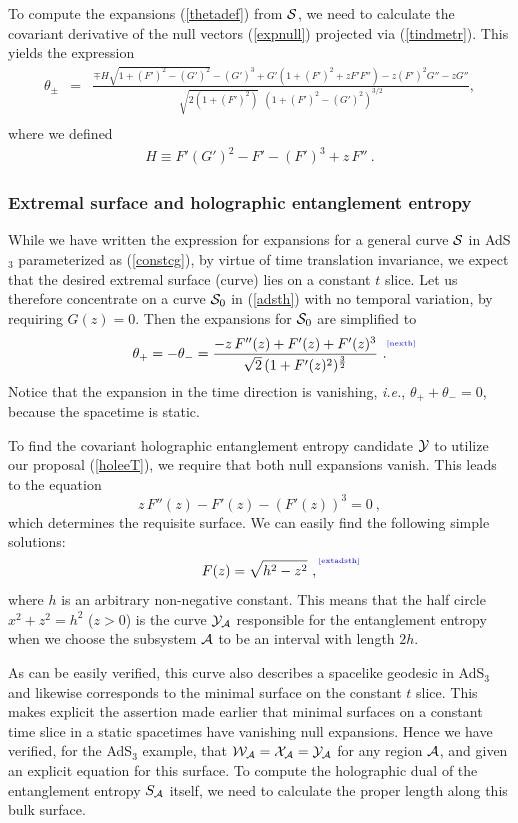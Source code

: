 \documentclass[12pt]{article}
\newcommand{\be}{\begin{equation}}
\newcommand{\ee}{\end{equation}}
\def\req#1{(\ref{#1})}
\def\ie{{\it i.e.}}
\def\s{\sigma}
\def\CA{{\cal A}}
\def\CS{{\cal S}}
\def\CW{{\cal W}}
\def\CX{{\cal X}}
\def\CY{{\cal Y}}
\def\f#1#2{{\frac{#1}{#2}}}
\def\f#1#2{{\frac{#1}{#2}}}
\def\Label#1{\label{#1}%
{ \color{blue}{\smash{\hbox to0pt{\raise2ex\hbox{\tiny[#1]}\hss}}}}}
\def\ms{\CS}
\def\Gms{\CW}
\def\Lms{\CY}
\def\Xms{\CX}
\def\rA{\CA}
\def\ads#1{AdS$_{#1}$}
\def\s{\sqrt}
\def\f {\frac}
\def\no{\nonumber \\}
\begin{document}
To compute the expansions \req{thetadef} from $\ms$, we need to calculate the
covariant derivative of the null vectors \req{expnull} projected via \req{tindmetr}.
This yields the expression
%
\begin{eqnarray}
\theta_{\pm} &=& \f{\mp H\s{1+(F')^2-(G')^2}
-(G')^3+G'(1+(F')^2+zF'F'')-z(F')^2G''-zG''}{\s{2(1+(F')^2)}\, \;
(1+(F')^2-(G')^2)^{3/2}}, \no
\end{eqnarray}
%
where we defined
\begin{eqnarray}
H \equiv F'(G')^2-F'-(F')^3+z \, F''\ .
\end{eqnarray}

\subsubsection{Extremal surface and holographic entanglement entropy}

While we have written the expression for expansions for a general
curve $\ms$ in \ads{3} parameterized as \req{constcg}, by virtue of
time translation invariance, we expect that the desired extremal
surface (curve)  lies  on a constant $t$ slice. Let us therefore
concentrate on a curve $\ms_0$ in \req{adsth} with no temporal
variation, by requiring $G(z)=0$. Then the expansions for $\ms_0$
are simplified to
%
\be \theta_+=-\theta_-=\f{-z\, F''(z)+F'(z)+F'(z)^3} {\s{2}\,
(1+F'(z)^2)^{\f{3}{2}}} \ . \Label{nexth}
 \ee
Notice that the expansion in the time direction is vanishing, \ie,
$\theta_+ +\theta_-=0$, because the spacetime is static.

To find the covariant holographic entanglement entropy candidate
$\Lms$ to utilize our proposal \req{holeeT}, we require that both
null expansions vanish. This leads to the equation
%
\be z \, F''(z)-F'(z)-(F'(z))^3=0 \ , \ee
%
which determines the requisite surface.
We can easily find the following simple solutions:
%
\be F(z)=\s{h^2-z^2} \ ,
\Label{extadsth} \ee
%
where $h$ is an arbitrary non-negative constant. This means that the
half circle $x^2+z^2=h^2$ ($z>0$) is the curve $\Lms_{\rA}$
responsible for the entanglement entropy when we choose the
subsystem $\rA$ to be an interval with length $2h$.

As can be easily verified, this curve also describes
a spacelike geodesic in AdS$_3$ and likewise corresponds to the minimal surface on
the constant $t$ slice. This makes explicit the assertion made
earlier that minimal surfaces on a constant time slice in a static
spacetimes have vanishing null expansions.
Hence we have verified, for the AdS$_3$ example, that $\Gms_{\rA} = \Xms_{\rA} = \Lms_{\rA}$ for any region $\rA$, and given an explicit equation for this surface.  To compute the holographic dual of the entanglement entropy $S_{\rA}$ itself, we need to calculate the proper length along this bulk surface.
\end{document}
